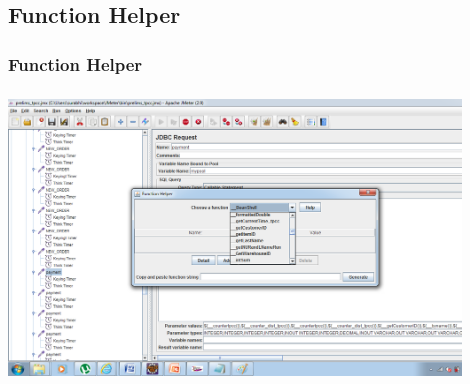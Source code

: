 \documentclass[12pt]{beamer}
\begin{document}
\subsection{Function Helper}
\begin{frame}[c]
\frametitle{Function Helper}
\centering
   \includegraphics[width=12cm, height=7.7cm]{images/functionhelper}

\end{frame}

\end{document}
